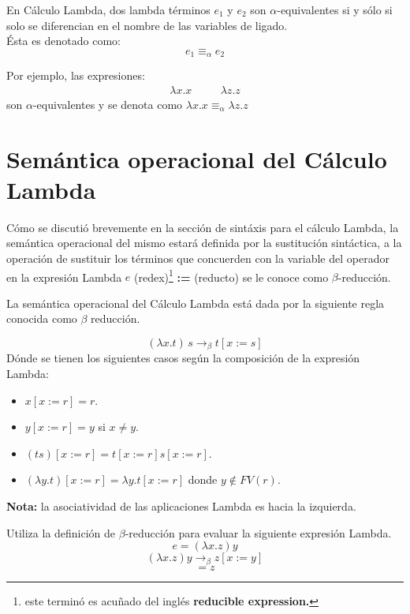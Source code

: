    \begin{definition} En Cálculo Lambda, dos lambda términos $e_1$ y $e_2$ son $\alpha$-equivalentes si y sólo si solo se diferencian en el nombre de las variables de ligado.\\
    Ésta es denotado como: $$e_1 \equiv_{\alpha} e_2 $$
    \end{definition}

     Por ejemplo, las expresiones:
    \[
        \begin{array}{ccc}
        \lambda x.x &\quad& \lambda z.z
        \end{array}
    \]
    \noindent
    son $\alpha$-equivalentes y se denota como $\lambda x.x\equiv_{\alpha}\lambda z.z$

    \section{Semántica operacional del Cálculo Lambda}
    Cómo se discutió brevemente en la sección de sintáxis para el cálculo Lambda, la semántica operacional del mismo estará definida por la sustitución sintáctica, a la operación de sustituir los términos que concuerden con la variable del operador en la expresión Lambda $e$ (redex)\footnote{este terminó es acuñado del inglés \textbf{reducible expression.}} \textbf{:=} (reducto) se le conoce como \textbf{$\beta$}-reducción.

    \bigskip

    \begin{definition} La semántica operacional del Cálculo Lambda está dada por la siguiente regla conocida como $\beta$ reducción.

    $$(\lambda x.t)\,s \to_\beta t[x:=s]$$
    Dónde se tienen los siguientes casos según la composición de la expresión Lambda:
        \begin{itemize}
        \item $x[x:=r] = r$. 
        \item $y[x:=r] = y$ si $x\neq y$.
        \item $(ts)[x:=r] = t[x:=r]s[x:=r]$.
        \item $(\lambda y.t)[x:=r] = \lambda y.t[x:=r]$ donde $y\notin FV(r)$.
        \end{itemize}
        \textbf{Nota:} la asociatividad de las aplicaciones Lambda es hacia la izquierda.
    \end{definition}
    
    \begin{exercise}
    Utiliza la definición de $\beta$-reducción para evaluar la siguiente expresión Lambda.
    $$e= (\lambda x.z)y$$
    \[ (\lambda x.z)y \rightarrow_\beta  z [x := y]\]
    \[ = z \]
    \end{exercise}

